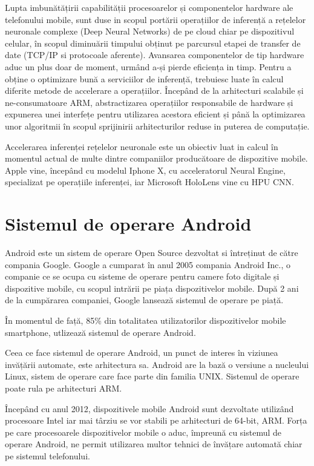 	Lupta imbunătățirii capabilității procesoarelor și componentelor hardware ale telefonului mobile, sunt duse in scopul portării operațiilor de inferență a rețelelor neuronale complexe (Deep Neural Networks) de pe cloud chiar pe dispozitivul celular, în scopul diminuării timpului obținut pe parcursul etapei de transfer de date (TCP/IP si protocoale aferente). Avansarea componentelor de tip hardware aduc un plus doar de moment, urmând a-și pierde eficiența in timp. Pentru a obține o optimizare bună a serviciilor de inferență, trebuiesc luate în calcul diferite metode de accelerare a operațiilor. Începând de la arhitecturi scalabile și ne-consumatoare ARM, abstractizarea operațiilor responsabile de hardware și expunerea unei interfețe pentru utilizarea acestora eficient și până la optimizarea unor algoritmii în scopul sprijinirii arhitecturilor reduse in puterea de computație.
	
	Accelerarea inferenței rețelelor neuronale este un obiectiv luat in calcul în momentul actual de multe dintre companiilor producătoare de dispozitive mobile. Apple vine, începând cu modelul Iphone X, cu acceleratorul Neural Engine, specializat pe operațiile inferenței, iar Microsoft HoloLens vine cu HPU CNN. \cite{arm_ml}
	
	\section{Sistemul de operare Android}
	
	Android este un sistem de operare Open Source dezvoltat si întreținut de către compania Google. Google a cumparat în anul 2005 compania Android Inc., o companie ce se ocupa cu sisteme de operare pentru camere foto digitale și dispozitive mobile, cu scopul intrării pe piața dispozitivelor mobile. După 2 ani de la cumpărarea companiei, Google lansează sistemul de operare pe piață. 
	
	În momentul de față, 85\% din totalitatea utilizatorilor dispozitivelor mobile smartphone, utlizează sistemul de operare Android. 
	
	Ceea ce face sistemul de operare Android, un punct de interes în viziunea invățării automate, este arhitectura sa. Android are la bază o versiune a nucleului Linux, sistem de operare care face parte din familia UNIX. Sistemul de operare poate rula pe arhitecturi ARM. 
	
	Începând cu anul 2012, dispozitivele mobile Android sunt dezvoltate utilizând procesoare Intel iar mai târziu se vor stabili pe arhitecturi de 64-bit, ARM. 
	Forța pe care procesoarele dispozitivelor mobile o aduc, împreună cu sistemul de operare Android, ne permit utilizarea multor tehnici de învățare automată chiar pe sistemul telefonului. 
	
